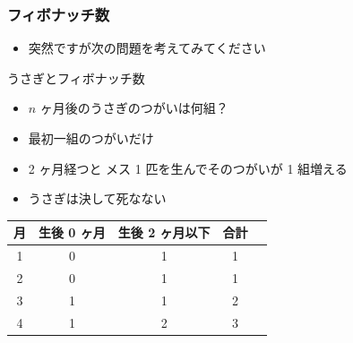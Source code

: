 \begin{frame}[fragile]
\frametitle{フィボナッチ数}
  \begin{itemize}
\item 突然ですが次の問題を考えてみてください
  \end{itemize}
  \begin{block}{うさぎとフィボナッチ数}
    \begin{itemize}
\item $n$ ヶ月後のうさぎのつがいは何組？
\item 最初一組のつがいだけ
\item 2 ヶ月経つと メス 1 匹を生んでそのつがいが 1 組増える
\item うさぎは決して死なない
    \end{itemize}
  \end{block}
  \begin{center}
    \begin{tabular}{ccccc}
月&生後 0 ヶ月&生後 2 ヶ月以下&合計\\
\hline
1&0&1&1\\
2&0&1&1\\
3&1&1&2\\
4&1&2&3\\
    \end{tabular}
  \end{center}
\end{frame}
